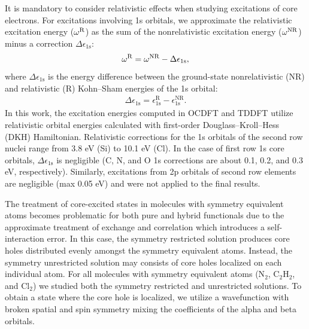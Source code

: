 \documentclass[12pt]{article}
\begin{document}
It is mandatory to consider relativistic effects when studying excitations of core electrons.\cite{maganas_l-edge_2014,debeer_george_calibration_2010,bauer_herfd-xas_2014,ankudinov_sensitivity_2002}
For excitations involving 1s orbitals, we approximate the relativistic excitation energy ($\omega^{\rm R}$) as the sum of the nonrelativistic excitation energy ($ \omega^{\rm NR}$) minus a correction $\Delta\epsilon_{\text{1s}}$:
\begin{align}
\omega^{\rm R} = \omega^{\rm NR} - \Delta\epsilon_{\text{1s}} ,
\end{align}
where $\Delta\epsilon_{\text{1s}}$ is the energy difference between the ground-state nonrelativistic (NR) and relativistic (R) Kohn--Sham energies of the 1s orbital:
\begin{align}
\Delta\epsilon_{\text{1s}} = \epsilon_{\text{1s}}^{\text{R}} - \epsilon_{\text{1s}}^{\text{NR}}.
\end{align}
In this work, the excitation energies computed in OCDFT and TDDFT utilize relativistic orbital energies calculated with first-order Douglass--Kroll--Hess (DKH) Hamiltonian.\cite{douglas_quantum_1973,hess_applicability_1985, hess_relativistic_1986} 
Relativistic corrections for the 1s orbitals of the second row nuclei range from 3.8 eV (Si) to 10.1 eV (Cl). 
In the case of first row 1s core orbitals, $\Delta\epsilon_{\text{1s}}$ is negligible (C, N, and O 1s corrections are about 0.1, 0.2, and 0.3 eV, respectively).  Similarly, excitations from 2p orbitals of second row elements are negligible (max 0.05 eV) and were not applied to the final results.

The treatment of core-excited states in molecules with symmetry equivalent atoms becomes problematic for both pure and hybrid functionals due to the approximate treatment of exchange and correlation which introduces a self-interaction error.\cite{bally_incorrect_1997,lundberg_quantifying_2005} In this case, the symmetry restricted solution produces core holes distributed evenly amongst the symmetry equivalent atoms. 
Instead, the symmetry unrestricted solution may consists of core holes localized on  each individual atom. 
For all molecules with symmetry equivalent atoms (N$_2$, C$_2$H$_2$, and Cl$_2$) we studied both the symmetry restricted and unrestricted solutions.
To obtain a state where the core hole is localized, we utilize a wavefunction with broken spatial and spin symmetry mixing the coefficients of the alpha and beta orbitals.
\end{document}
